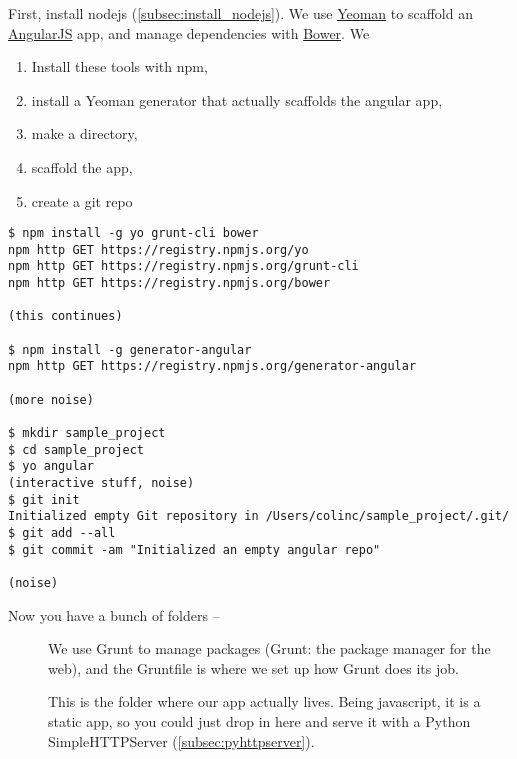 First, install nodejs (\autoref{subsec:install_nodejs}).
We use \href{http://yeoman.io/}{Yeoman} to scaffold an
\href{http://angularjs.org/}{AngularJS} app, and manage dependencies with 
\href{http://bower.io/}{Bower}.  We 
\begin{enumerate}
\item Install these tools with npm,
\item install a Yeoman generator that actually scaffolds the angular app,
\item make a directory,
\item scaffold the app,
\item create a git repo
\end{enumerate}

\begin{lstlisting}[style=bash]
$ npm install -g yo grunt-cli bower
npm http GET https://registry.npmjs.org/yo
npm http GET https://registry.npmjs.org/grunt-cli
npm http GET https://registry.npmjs.org/bower

(this continues)

$ npm install -g generator-angular
npm http GET https://registry.npmjs.org/generator-angular

(more noise)

$ mkdir sample_project
$ cd sample_project
$ yo angular
(interactive stuff, noise)
$ git init
Initialized empty Git repository in /Users/colinc/sample_project/.git/
$ git add --all
$ git commit -am "Initialized an empty angular repo"

(noise)
\end{lstlisting}

Now you have a bunch of folders -- 
\begin{description}
\item[] We use Grunt to manage packages (Grunt: the package
manager for the web), and the Gruntfile is where we set up how Grunt does its
job.
\item[] This is the folder where our app actually lives.  Being
javascript, it is a static app, so you could just drop in here and serve
it with a Python SimpleHTTPServer (\autoref{subsec:pyhttpserver}).  
\end{description}
